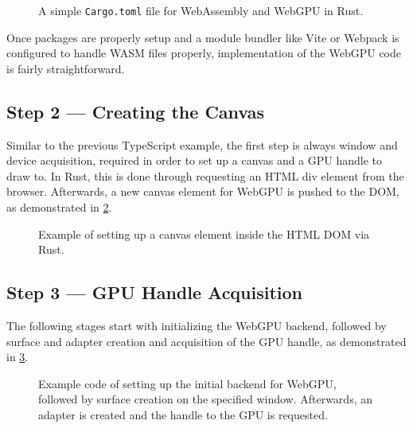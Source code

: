 \begin{figure}[tp]
  \centering

  \caption[Code Snippet: Cargo.toml]
  {
    A simple \lstinline{Cargo.toml} file for WebAssembly and WebGPU in Rust.
  }
  \label{code:cargo}
\end{figure}


Once packages are properly setup and a module bundler like Vite or Webpack is configured to handle WASM files properly,
implementation of the WebGPU code is fairly straightforward.



\subsection{Step 2 --- Creating the Canvas}
Similar to the previous TypeScript example, the first step is always window and device acquisition, required in order
to set up a canvas and a GPU handle to draw to. In Rust, this is done through requesting an HTML div element from the browser.
Afterwards, a new canvas element for WebGPU is pushed to the DOM, as demonstrated in \ref{code:rust-canvas}.

\begin{figure}[tp]
  \centering

  \caption[Code Snippet: Canvas Setup]
  {
    Example of setting up a canvas element inside the HTML DOM via Rust.
  }
  \label{code:rust-canvas}
\end{figure}



\subsection{Step 3 --- GPU Handle Acquisition}
The following stages start with initializing the WebGPU backend, followed by surface and adapter creation and acquisition
of the GPU handle, as demonstrated in \ref{code:rust-handle}.

\begin{figure}[tp]
  \centering

  \caption[Code Snippet: Backend, surface, adapter, and GPU handle setup]
  {
    Example code of setting up the initial backend for WebGPU, followed by surface creation on the
    specified window. Afterwards, an adapter is created and the handle to the GPU is requested.
  }
  \label{code:rust-handle}
\end{figure}


